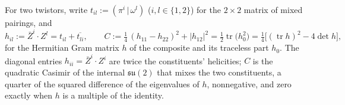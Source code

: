\documentclass[11pt]{article}
\theoremstyle{definition}
\theoremstyle{plain}
\providecommand{\tr}{}\renewcommand{\tr}{\operatorname{tr}}
\providecommand{\hp}{}\renewcommand{\hp}[2]{( #1 \,|\, #2 )}
\begin{document}
\label{c:note.mass.setting-grip-composite-frozen-point-3}
For two twistors, write $t_{il} := \hp{\pi^{i}}{\omega^{l}}$ ($i, l \in \{1,2\}$) for the $2 \times 2$ matrix of mixed pairings, and
\begin{equation}
h_{il} := \bar{Z}^{i}\cdot Z^{l} = t_{il} + \overline{t_{li}}, \qquad
C := \tfrac14\,(h_{11} - h_{22})^{2} + |h_{12}|^{2} = \tfrac12\tr\bigl(h_{0}^{2}\bigr) = \tfrac14\bigl[(\tr h)^{2} - 4\det h\bigr],
\end{equation}
for the Hermitian Gram matrix $h$ of the composite and its traceless part $h_{0}$. The diagonal entries $h_{ii} = \bar{Z}^{i}\cdot Z^{i}$ are twice the constituents' helicities; $C$ is the quadratic Casimir of the internal $\mathfrak{su}(2)$ that mixes the two constituents, a quarter of the squared difference of the eigenvalues of $h$, nonnegative, and zero exactly when $h$ is a multiple of the identity.
\end{document}

